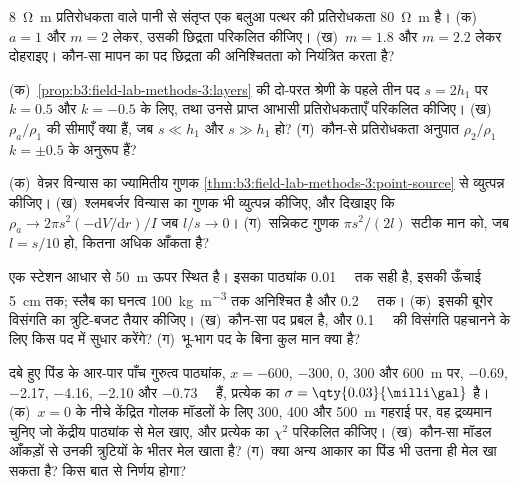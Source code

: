\begin{exercise}[$\star\star$]\label{exo:b3:field-lab-methods-3:8}
\qty{8}{\ohm\metre} प्रतिरोधकता वाले पानी से संतृप्त एक बलुआ पत्थर की
प्रतिरोधकता \qty{80}{\ohm\metre} है। (क)~$a = 1$ और $m = 2$ लेकर,
उसकी छिद्रता परिकलित कीजिए। (ख)~$m = 1.8$ और $m = 2.2$ लेकर दोहराइए। कौन-सा
मापन का पद छिद्रता की अनिश्चितता को नियंत्रित करता है?
\end{exercise}

\begin{exercise}[$\star\star$]\label{exo:b3:field-lab-methods-3:9}
(क)~\cref{prop:b3:field-lab-methods-3:layers} की दो-परत श्रेणी के पहले तीन पद
$s = 2h_1$ पर $k =
\num{0.5}$ और $k = \num{-0.5}$ के लिए, तथा उनसे प्राप्त आभासी प्रतिरोधकताएँ परिकलित कीजिए।
(ख)~$\rho_a/\rho_1$ की सीमाएँ क्या हैं, जब $s \ll h_1$ और
$s \gg h_1$ हो? (ग)~कौन-से प्रतिरोधकता अनुपात $\rho_2/\rho_1$
$k = \pm 0.5$ के अनुरूप हैं?
\end{exercise}

\begin{exercise}[$\star\star\star$]\label{exo:b3:field-lab-methods-3:10}
(क)~वेन्नर विन्यास का ज्यामितीय गुणक
\cref{thm:b3:field-lab-methods-3:point-source} से व्युत्पन्न कीजिए। (ख)~श्लमबर्जर विन्यास का गुणक भी व्युत्पन्न कीजिए, और
दिखाइए कि $\rho_a \to 2\pi s^2(-\mathrm{d}V/
\mathrm{d}r)/I$ जब $l/s \to 0$। (ग)~सन्निकट
गुणक $\pi s^2/(2l)$ सटीक मान को, जब $l = s/10$ हो, कितना अधिक आँकता है?
\end{exercise}

\begin{exercise}[$\star\star\star$]\label{exo:b3:field-lab-methods-3:11}
एक स्टेशन आधार से \qty{50}{m} ऊपर स्थित है। इसका पाठ्यांक
\qty{0.01}{\milli\gal} तक सही है, इसकी ऊँचाई \qty{5}{cm} तक; स्लैब का घनत्व
\qty{100}{kg.m^{-3}} तक अनिश्चित है और 
\qty{0.2}{\milli\gal} तक। (क)~इसकी बूगेर विसंगति का त्रुटि-बजट तैयार कीजिए।
(ख)~कौन-सा पद प्रबल है, और \qty{0.1}{\milli\gal} की विसंगति पहचानने
के लिए किस पद में सुधार करेंगे? (ग)~भू-भाग पद के बिना
कुल मान क्या है?
\end{exercise}

\begin{exercise}[$\star\star\star$]\label{exo:b3:field-lab-methods-3:12}
दबे हुए पिंड के आर-पार पाँच गुरुत्व पाठ्यांक, $x = -600$, $-300$, $0$,
$300$ और \qty{600}{m} पर, \num{-0.69}, \num{-2.17}, \num{-4.16},
\num{-2.10} और \qty{-0.73}{\milli\gal} हैं, प्रत्येक का $\sigma =
\qty{0.03}{\milli\gal}$ है। (क)~$x = 0$ के नीचे केंद्रित गोलक मॉडलों के लिए
\num{300}, \num{400} और \qty{500}{m} गहराई पर, वह द्रव्यमान चुनिए जो
केंद्रीय पाठ्यांक से मेल खाए, और प्रत्येक का  $\chi^2$ परिकलित कीजिए। (ख)~कौन-सा
मॉडल आँकड़ों से उनकी त्रुटियों के भीतर मेल खाता है? (ग)~क्या अन्य आकार का
पिंड भी उतना ही मेल खा सकता है? किस बात से निर्णय होगा?
\end{exercise}

